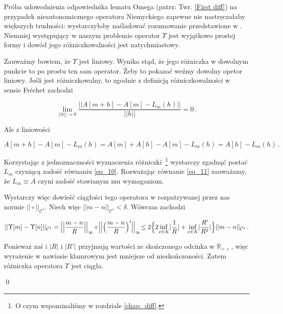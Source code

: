 	Próba udowodnienia odpowiednika lematu Omega (patrz: Twr. \ref{First diff}) na przypadek nieautonomicznego operatora Niemyckiego zapewne nie nastręczałaby większych trudności: wystarczyłoby naśladować rozumowanie przedstawione w \citep{Mardsen}. Niemniej występujący w naszym problemie operator $\Upsilon$ jest wyjątkowo prostej formy i dowód jego różniczkowalności jest natychmiastowy.

	Zauważmy bowiem, że $\Upsilon$ jest liniowy. Wynika stąd, że jego różniczka w dowolnym punkcie to po prostu ten sam operator. Żeby to pokazać weźmy dowolny opetor liniowy. Jeśli jest różniczkowalny, to zgodnie z definicją różniczkowalności w sensie Fr\' echet zachodzi
	
\begin{equation}\label{eq_10}
	\underset{|| h|| \rightarrow 0}{\lim} \frac{||A[m+h]-A[m]-L_m(h)||}{||h||} = 0\,.
\end{equation}	
	
Ale z liniowości	
	
\begin{equation}\label{eq_11}
	A[m+h]-A[m]-L_m(h) = A[m] + A[h] - A[m] - L_m (h) = A[h] - L_m(h)\,.
\end{equation}
	
Korzystając z jednoznaczności wyznaczenia różniczki~\footnote{O czym wspominaliśmy w rozdziale \ref{chap_diff}.} wystarczy zgadnąć postać $L_m$ czyniącą zadość równaniu \ref{eq_10}. Rozważając równanie \ref{eq_11} zauważamy, że $L_m \equiv A$ czyni zadość stawianym mu wymaganiom.

Wystarczy więc dowieść ciągłości tego operatora w rozpatrywanej przez nas normie $|| \circ||_{\mathcal{C}^{1}}$. Niech więc $|| m - n||_{\mathcal{C}^{1}} < \delta$. Wówczas zachodzi

\begin{equation*}
	|| \Upsilon[m] - \Upsilon[n] ||_{\mathcal{C}^{1}} = \Bigl|\Bigl| \frac{m-n}{R}\Bigl|\Bigl|_{\infty}	+ \Bigl|\Bigl|\Big(\frac{m-n}{R}\Big)'\Bigl|\Bigl|_{\infty} 
\leq 2\Bigl \{  2\underset{x \in K}{\inf}|\frac{1}{R}| +  \underset{x \in K}{\inf}|\frac{R'}{R^2}| \Bigl\} || m - n||_{\mathcal{C}^{1}} \,.
\end{equation*}

Ponieważ zaś i $|R|$ i $|R'|$ przyjmują wartości ze skończonego odcinka w $\mathbb{R}_{++}$, więc wyrażenie w nawiasie klamrowym jest mniejsze od nieskończoności. Zatem różniczka operatora $\Upsilon$ jest ciągła.

\qed
\newline

